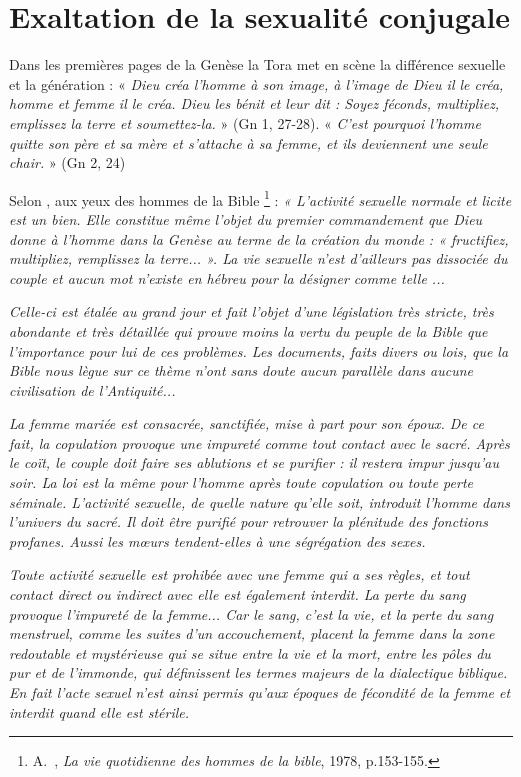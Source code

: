 \section{Exaltation de la sexualité conjugale}

 Dans les premières pages de la Genèse la Tora met en scène la différence sexuelle et la génération : « \emph{Dieu créa l'homme à son image, à l'image de Dieu il le créa, homme et femme il le créa. Dieu les bénit et leur dit : Soyez féconds, multipliez, emplissez la terre et soumettez-la.} » (Gn 1, 27-28). « \emph{C'est pourquoi l'homme quitte son père et sa mère et s'attache à sa femme, et ils deviennent une seule chair.} » (Gn 2, 24)

 Selon , aux yeux des hommes de la Bible%
\footnote{A.~, \emph{La vie quotidienne des hommes de la bible}, 1978, p.153-155.}%
 : \emph{« L'activité sexuelle normale et licite est un bien. Elle constitue même l'objet du premier commandement que Dieu donne à l'homme dans la Genèse au terme de la création du monde : « fructifiez, multipliez, remplissez la terre... ». La vie sexuelle n'est d'ailleurs pas dissociée du couple et aucun mot n'existe en hébreu pour la désigner comme telle ...}

 \emph{Celle-ci est étalée au grand jour et fait l'objet d'une législation très stricte, très abondante et très détaillée qui prouve moins la vertu du peuple de la Bible que l'importance pour lui de ces problèmes. Les documents, faits divers ou lois, que la Bible nous lègue sur ce thème n'ont sans doute aucun parallèle dans aucune civilisation de l'Antiquité...}

 \emph{La femme mariée est consacrée, sanctifiée, mise à part pour son époux. De ce fait, la copulation provoque une impureté comme tout contact avec le sacré. Après le coït, le couple doit faire ses ablutions et se purifier : il restera impur jusqu'au soir. La loi est la même pour l'homme après toute copulation ou toute perte séminale. L'activité sexuelle, de quelle nature qu'elle soit, introduit l'homme dans l'univers du sacré. Il doit être purifié pour retrouver la plénitude des fonctions profanes. Aussi les mœurs tendent-elles à une ségrégation des sexes.}

 \emph{Toute activité sexuelle est prohibée avec une femme qui a ses règles, et tout contact direct ou indirect avec elle est également interdit. La perte du sang provoque l'impureté de la femme... Car le sang, c'est la vie, et la perte du sang menstruel, comme les suites d'un accouchement, placent la femme dans la zone redoutable et mystérieuse qui se situe entre la vie et la mort, entre les pôles du pur et de l'immonde, qui définissent les termes majeurs de la dialectique biblique. En fait l'acte sexuel n'est ainsi permis qu'aux époques de fécondité de la femme et interdit quand elle est stérile.}

